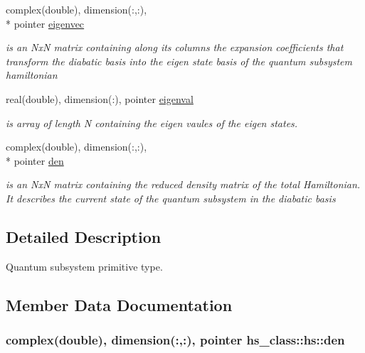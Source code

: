 \begin{DoxyCompactItemize}
complex(double), dimension(\-:,\-:), \\*
pointer \hyperlink{strucths__class_1_1hs_aac60f7bc14df6c4a5a1363c70b69b2db}{eigenvec}
\begin{DoxyCompactList}\small\item\em is an Nx\-N matrix containing along its columns the expansion coefficients that transform the diabatic basis into the eigen state basis of the quantum subsystem hamiltonian \end{DoxyCompactList}\item 
real(double), dimension(\-:), pointer \hyperlink{strucths__class_1_1hs_ae978013c998c123a7430209fa2797511}{eigenval}
\begin{DoxyCompactList}\small\item\em is array of length N containing the eigen vaules of the eigen states. \end{DoxyCompactList}\item 
complex(double), dimension(\-:,\-:), \\*
pointer \hyperlink{strucths__class_1_1hs_ad8d40ef9d0cb7af5e9d889f2ec05225d}{den}
\begin{DoxyCompactList}\small\item\em is an Nx\-N matrix containing the reduced density matrix of the total Hamiltonian. It describes the current state of the quantum subsystem in the diabatic basis \end{DoxyCompactList}\end{DoxyCompactItemize}


\subsection{Detailed Description}
Quantum subsystem primitive type. 

\subsection{Member Data Documentation}
\hypertarget{strucths__class_1_1hs_ad8d40ef9d0cb7af5e9d889f2ec05225d}{
\subsubsection[{den}]{\setlength{\rightskip}{0pt plus 5cm}complex(double), dimension(\-:,\-:), pointer hs\-\_\-class\-::hs\-::den\hspace{0.3cm}{\ttfamily [private]}}}\label{strucths__class_1_1hs_ad8d40ef9d0cb7af5e9d889f2ec05225d}


